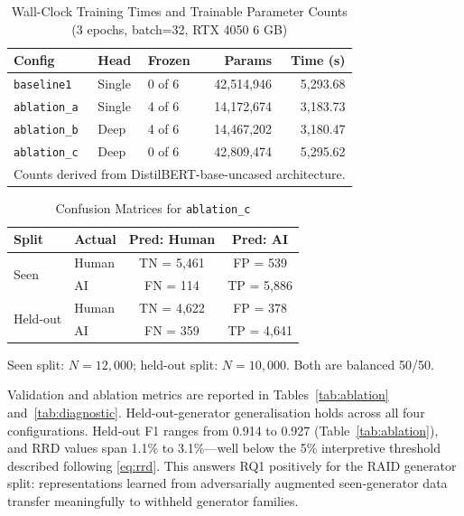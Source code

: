 \documentclass[conference]{IEEEtran}
\begin{document}
\begin{table}[t]
\caption{Wall-Clock Training Times and Trainable Parameter Counts (3 epochs, batch=32, RTX 4050 6 GB)}
\label{tab:wallclock}
\begin{center}
\footnotesize
\begin{tabular}{lllrr}
\toprule
\textbf{Config} & \textbf{Head} & \textbf{Frozen} & \textbf{Params} & \textbf{Time (s)}\\
\midrule
\texttt{baseline1}  & Single & 0 of 6 & 42,514,946 & 5,293.68\\
\texttt{ablation\_a}& Single & 4 of 6 & 14,172,674 & 3,183.73\\
\texttt{ablation\_b}& Deep   & 4 of 6 & 14,467,202 & 3,180.47\\
\texttt{ablation\_c}& Deep   & 0 of 6 & 42,809,474 & 5,295.62\\
\bottomrule
\multicolumn{5}{l}{\footnotesize Counts derived from DistilBERT-base-uncased architecture.}
\end{tabular}
\end{center}
\end{table}

\begin{table}[t]
\caption{Confusion Matrices for \texttt{ablation\_c}}
\label{tab:conf_seen}
\begin{center}
\small
\begin{tabular}{llcc}
\toprule
\textbf{Split} & \textbf{Actual} & \textbf{Pred: Human} & \textbf{Pred: AI}\\
\midrule
\multirow{2}{*}{Seen} & Human & TN = 5,461 & FP = 539\\
 & AI & FN = 114 & TP = 5,886\\
\midrule
\multirow{2}{*}{Held-out} & Human & TN = 4,622 & FP = 378\\
 & AI & FN = 359 & TP = 4,641\\
\bottomrule
\end{tabular}

\vspace{4pt}
\footnotesize Seen split: $N=12{,}000$; held-out split: $N=10{,}000$. Both are balanced 50/50.
\end{center}
\end{table}

Validation and ablation metrics are reported in Tables~\ref{tab:ablation}
and~\ref{tab:diagnostic}. Held-out-generator generalisation holds across all
four configurations.
Held-out F1 ranges from 0.914 to 0.927 (Table~\ref{tab:ablation}), and RRD values span 1.1\% to
3.1\%---well below the 5\% interpretive threshold described following
\eqref{eq:rrd}. This answers RQ1 positively for the RAID generator split:
representations learned from adversarially augmented seen-generator data
transfer meaningfully to withheld generator families.
\end{document}
